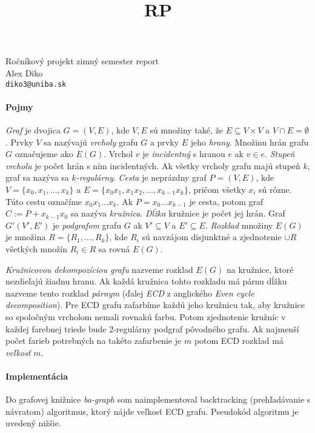 \documentclass[11pt]{article}
\theoremstyle{definition}
\begin{document}
\newtheorem{definition}{Definícia}

\theoremstyle{definition}
\newtheorem{theorem}{Tvrdenie}

\title{RP}
\begin{center}
    {\LARGE Ročníkový projekt zimný semester report}\\[1em]
    {\large Alex Diko  \\ \texttt{diko3@uniba.sk}}\\[1em]
\end{center}

\paragraph{Pojmy}

\textit{Graf} je dvojica $G = (V,E)$, kde $V,E$ sú množiny také, že $E \subseteq V\times V$
a $V \cap E = \emptyset$. Prvky $V$ sa nazývajú \textit{vrcholy} grafu $G$ a prvky $E$ jeho \textit{hrany}.
Množinu hrán grafu $G$ označujeme ako $E(G)$. Vrchol 
$v$ je \textit{incidentný} s hranou $e$ ak $v\in e$. \textit{Stupeň vrcholu} je počet
hrán s ním incidentných. Ak všetky vrcholy grafu
majú stupeň $k$, graf sa nazýva sa \textit{$k$-regulárny}. \textit{Cesta} je neprázdny graf $P = (V,E)$,
kde $V = \{x_0, x_1, \ldots, x_k\}$ a $E = \{x_0x_1, x_1x_2, \ldots, x_{k-1}x_k\}$,
pričom všetky $x_i$ sú rôzne. Túto cestu označíme $x_0x_1\ldots x_k$. Ak $P = x_0\ldots x_{k-1}$ je cesta, potom
graf $C := P + x_{k-1}x_0$ sa nazýva \textit{kružnica}. \textit{Dĺžka} kružnice je počet jej hrán. Graf
$ G'(V',E')$ je \textit{podgrafom} grafu $G$ ak $V' \subseteq V$ a $E' \subseteq E$.
\textit{Rozklad} množiny $E(G)$ je množina $R = \{R_1, \ldots, R_k\}$, kde $R_i$
sú navzájom disjunktné a zjednotenie $\cup R$ všetkých množín $R_i \in R$ sa rovná $E(G)$.

\textit{Kružnicovou dekompozíciou grafu} nazveme rozklad $E(G)$ na kružnice, ktoré nezdieľajú žiadnu
hranu. Ak každá kružnica tohto rozkladu má párnu dĺžku nazveme tento rozklad \textit{párnym} (ďalej
\textit{ECD} z anglického \textit{Even cycle decomposition}).
Pre ECD grafu zafarbíme každú jeho kružnicu tak, aby kružnice so spoločným
vrcholom nemali rovnakú farbu. Potom zjednotenie kružníc v každej farebnej triede 
bude 2-regulárny podgraf pôvodného grafu. Ak najmenší počet farieb potrebných 
na takéto zafarbenie je $m$ potom ECD rozklad má \textit{veľkosť} $m$.

\paragraph{Implementácia}
Do grafovej knižnice \textit{ba-graph} som naimplementoval backtracking (prehľadávanie 
s návratom) algoritmus, ktorý nájde veľkosť ECD grafu. Pseudokód algoritmu je uvedený nižšie.
\end{document}
